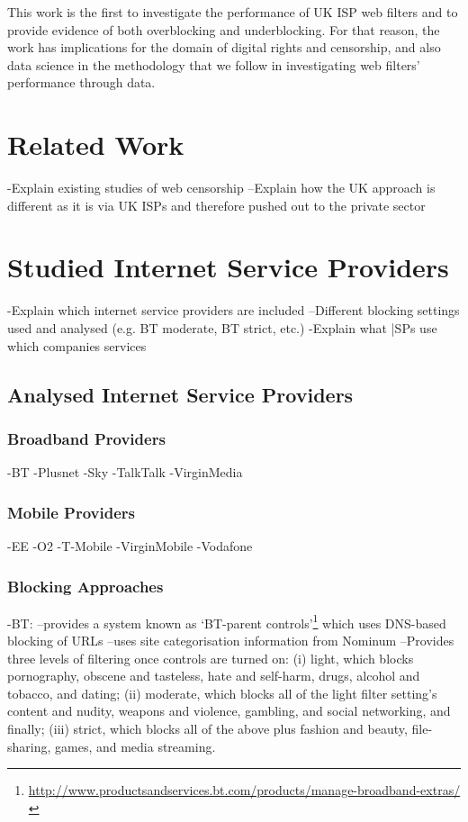 \documentclass{bmcart}
\begin{document}
This work is the first to investigate the performance of UK ISP web filters and to provide evidence of both overblocking and underblocking.
For that reason, the work has implications for the domain of digital rights and censorship, and also data science in the methodology that we follow in investigating web filters' performance through data.









\section*{Related Work}
-Explain existing studies of web censorship
--Explain how the UK approach is different as it is via UK ISPs and therefore pushed out to the private sector

\section*{Studied Internet Service Providers}
-Explain which internet service providers are included
--Different blocking settings used and analysed (e.g. BT moderate, BT strict, etc.)
-Explain what |SPs use which companies services

\subsection*{Analysed Internet Service Providers}

\subsubsection*{Broadband Providers}
-BT
-Plusnet
-Sky
-TalkTalk
-VirginMedia

\subsubsection*{Mobile Providers}
-EE
-O2
-T-Mobile
-VirginMobile
-Vodafone

\subsubsection*{Blocking Approaches}
-BT: 
--provides a system known as `BT-parent controls'\footnote{\url{http://www.productsandservices.bt.com/products/manage-broadband-extras/}} which uses DNS-based blocking of URLs
--uses site categorisation information from Nominum
--Provides three levels of filtering once controls are turned on: (i) light, which blocks pornography, obscene and tasteless, hate and self-harm, drugs, alcohol and tobacco, and dating; (ii) moderate, which blocks all of the light filter setting's content and nudity, weapons and violence, gambling, and social networking, and finally; (iii) strict, which blocks all of the above plus fashion and beauty, file-sharing, games, and media streaming.
\end{document}
